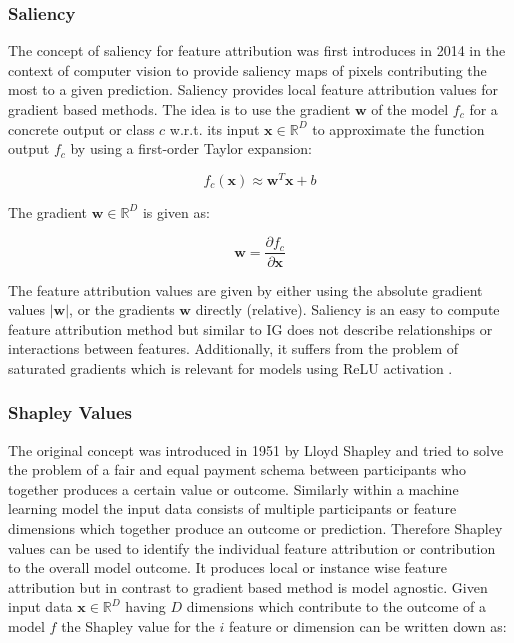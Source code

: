 \documentclass[../main.tex]{subfiles}
\begin{document}
\subsubsection{Saliency}

The concept of saliency for feature attribution was first introduces in 2014 \cite{simonyan_deep_2014} in the context of computer vision to provide saliency maps of pixels contributing the most to a given prediction. Saliency provides local feature attribution values for gradient based methods. The idea is to use the gradient $\mathbf{w}$ of the model $f_c$ for a concrete output or class $c$ w.r.t. its input $\mathbf{x} \in \mathbb{R}^D$ to approximate the function output $f_c$ by using a first-order Taylor expansion:

\begin{equation}
    f_c(\mathbf{x}) \approx \mathbf{w}^T \mathbf{x} + b
\end{equation}

The gradient $\mathbf{w} \in \mathbb{R}^D$ is given as:

\begin{equation}
    \mathbf{w}=\frac{\partial f_c}{\partial \mathbf{x}}
\end{equation}

The feature attribution values are given by either using the absolute gradient values $|\mathbf{w}|$, or the gradients $\mathbf{w}$ directly (relative). Saliency is an easy to compute feature attribution method but similar to IG does not describe relationships or interactions between features. Additionally, it suffers from the problem of saturated gradients which is relevant for models using ReLU activation \cite{shrikumar_learning_2017}.

\subsubsection{Shapley Values}

The original concept was introduced in 1951 by Lloyd Shapley \cite{shapley1951notes} and tried to solve the problem of a fair and equal payment schema between participants who together produces a certain value or outcome. Similarly within a machine learning model the input data consists of multiple participants or feature dimensions which together produce an outcome or prediction. Therefore Shapley values can be used to identify the individual feature attribution or contribution to the overall model outcome. It produces local or instance wise feature attribution but in contrast to gradient based method is model agnostic. 
Given input data $\mathbf{x} \in \mathbb{R}^D$ having $D$ dimensions which contribute to the outcome of a model $f$ the Shapley value for the $i$ feature or dimension can be written down as:
\end{document}
